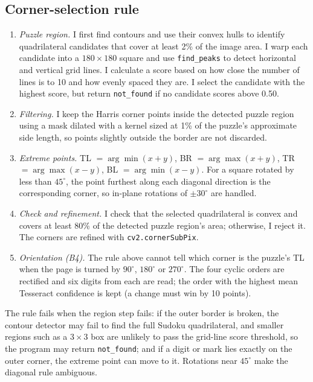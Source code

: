 \documentclass[conference]{IEEEtran}%
\begin{document}
\subsection{Corner-selection rule}
\begin{enumerate}
\item \emph{Puzzle region.} I first find contours and use their convex hulls
to identify quadrilateral candidates that cover at least 2\% of the image
area. I warp each candidate into a $180\times180$ square and use
\texttt{find\_peaks} to detect horizontal and vertical grid lines. I calculate
a score based on how close the number of lines is to 10 and how evenly spaced
they are. I select the candidate with the highest score, but return
\texttt{not\_found} if no candidate scores above 0.50.
\item \emph{Filtering.} I keep the Harris corner points inside the detected
puzzle region using a mask dilated with a kernel sized at 1\% of the puzzle's
approximate side length, so points slightly outside the border are not
discarded.
\item \emph{Extreme points.} TL $=\arg\min(x+y)$, BR $=\arg\max(x+y)$,
TR $=\arg\max(x-y)$, BL $=\arg\min(x-y)$. For a square rotated by less than
$45^\circ$, the point furthest along each diagonal direction is the
corresponding corner, so in-plane rotations of $\pm30^\circ$ are handled.
\item \emph{Check and refinement.} I check that the selected quadrilateral is
convex and covers at least 80\% of the detected puzzle region's area;
otherwise, I reject it. The corners are refined with \texttt{cv2.cornerSubPix}.
\item \emph{Orientation (B4).} The rule above cannot tell which corner is the
puzzle's TL when the page is turned by $90^\circ$, $180^\circ$ or $270^\circ$.
The four cyclic orders are rectified and six digits from each are read; the
order with the highest mean Tesseract confidence is kept (a change must win by
10 points).
\end{enumerate}
The rule fails when the region step fails: if the outer border is broken, the
contour detector may fail to find the full Sudoku quadrilateral, and smaller
regions such as a $3\times3$ box are unlikely to pass the grid-line score
threshold, so the program may return \texttt{not\_found}; and if a digit or mark lies exactly on
the outer corner, the extreme point can move to it. Rotations near $45^\circ$
make the diagonal rule ambiguous.
\end{document}
